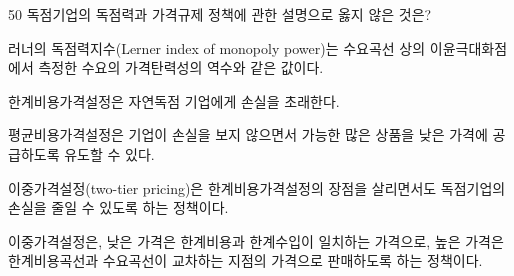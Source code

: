 \begin{question}{50}
독점기업의 독점력과 가격규제 정책에 관한 설명으로 옳지 않은 것은?
\begin{choices}
  \item 러너의 독점력지수(Lerner index of monopoly power)는 수요곡선 상의 이윤극대화점에서 측정한 수요의 가격탄력성의 역수와 같은 값이다.
  \item 한계비용가격설정은 자연독점 기업에게 손실을 초래한다.
  \item 평균비용가격설정은 기업이 손실을 보지 않으면서 가능한 많은 상품을 낮은 가격에 공급하도록 유도할 수 있다.
  \item 이중가격설정(two-tier pricing)은 한계비용가격설정의 장점을 살리면서도 독점기업의 손실을 줄일 수 있도록 하는 정책이다.
  \item 이중가격설정은, 낮은 가격은 한계비용과 한계수입이 일치하는 가격으로, 높은 가격은 한계비용곡선과 수요곡선이 교차하는 지점의 가격으로 판매하도록 하는 정책이다.
\end{choices}
\end{question}

